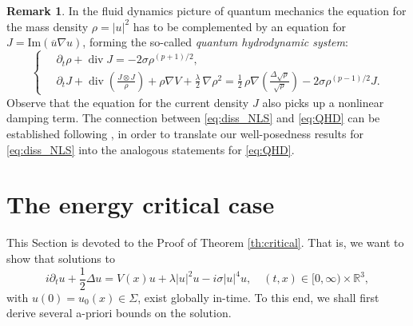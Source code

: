 \documentclass[a4paper,leqno]{amsart}
\theoremstyle{plain}
\theoremstyle{definition}
\newtheorem{remark}[theorem]{Remark}
\numberwithin{equation}{section}
\begin{document}
\begin{remark} In the fluid dynamics picture of quantum mechanics the equation for the mass density $\rho=|u|^2$ has to 
be complemented by an equation for $J={\mathrm{Im}}({\overline{{u}}}\nabla u)$, forming the so-called \emph{quantum hydrodynamic system}:
\begin{equation}\label{eq:QHD}
\left \{
\begin{split}
& \,  {\partial}_t\rho+\operatorname{div} J=-2\sigma\rho^{(p+1)/2},\\
& \,  {\partial}_t J +\operatorname{div} \left( \frac{J \otimes J}{\rho} \right) + \rho \nabla V + \frac{\lambda}{2}\, \nabla \rho^2  =   \frac{1}{2}\, \rho \nabla \left( \frac{\Delta \sqrt \rho} {\sqrt \rho} \right) - 2\sigma\rho^{(p-1)/2}J.
\end{split}
\right.
\end{equation}
Observe that the equation for the current density $J$ also picks up a nonlinear damping term.
The connection between \eqref{eq:diss_NLS} and \eqref{eq:QHD} can be established following \cite{AnMa, GaMa}, in order to translate our well-posedness results
for \eqref{eq:diss_NLS} into the analogous statements for \eqref{eq:QHD}.
\end{remark}

\section{The energy critical case}\label{sec:critical}

This Section is devoted to the Proof of Theorem \ref{th:critical}. That is, we want to show that solutions to
\begin{equation}\label{eq:quintic_NLS}
i{\partial}_t u  + {\frac{1}{2}}\Delta u =  V(x) u+   \lambda|u |^2 u -i\sigma| u |^{4}u , \quad (t,x) \in [0, \infty)\times {{\mathbb R}}^3,
\end{equation}
with $u(0) = u_0(x) \in \Sigma$, exist globally in-time. To this end, we shall first derive 
several a-priori bounds on the solution.
\end{document}
